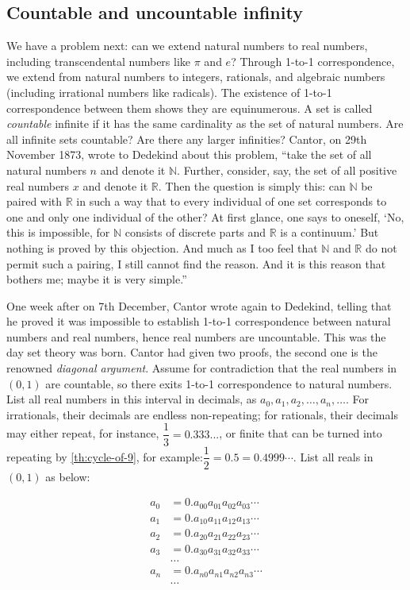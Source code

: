 \documentclass[b5paper]{article}
\begin{document}
\subsection{Countable and uncountable infinity}
We have a problem next: can we extend natural numbers to real numbers, including transcendental numbers like $\pi$ and $e$? Through 1-to-1 correspondence, we extend from natural numbers to integers, rationals, and algebraic numbers (including irrational numbers like radicals). The existence of 1-to-1 correspondence between them shows they are equinumerous. A set is called \emph{countable} infinite if it has the same cardinality as the set of natural numbers. Are all infinite sets countable? Are there any larger infinities? Cantor, on 29th November 1873, wrote to Dedekind about this problem, \enquote{take the set of all natural numbers $n$ and denote it $\mathbb{N}$. Further, consider, say, the set of all positive real numbers $x$ and denote it $\mathbb{R}$. Then the question is simply this: can $\mathbb{N}$ be paired with $\mathbb{R}$ in such a way that to every individual of one set corresponds to one and only one individual of the other? At first glance, one says to oneself, \enquote{No, this is impossible, for $\mathbb{N}$ consists of discrete parts and $\mathbb{R}$ is a continuum.} But nothing is proved by this objection. And much as I too feel that $\mathbb{N}$ and $\mathbb{R}$ do not permit such a pairing, I still cannot find the reason. And it is this reason that bothers me; maybe it is very simple.}

One week after on 7th December, Cantor wrote again to Dedekind, telling that he proved it was impossible to establish 1-to-1 correspondence between natural numbers and real numbers, hence real numbers are uncountable. This was the day set theory was born. Cantor had given two proofs, the second one is the renowned {\em diagonal argument}. Assume for contradiction that the real numbers in $(0, 1)$ are countable, so there exits 1-to-1 correspondence to natural numbers. List all real numbers in this interval in decimals, as $a_0, a_1, a_2, \dotsc, a_n, \dotsc$. For irrationals, their decimals are endless non-repeating; for rationals, their decimals may either repeat, for instance, $\dfrac{1}{3} = 0.333...$, or finite that can be turned into repeating by \cref{th:cycle-of-9}, for example:$\dfrac{1}{2} = 0.5 = 0.4999\dotsm$. List all reals in $(0, 1)$ as below:

\begin{align*}
a_0 &= 0.a_{00}a_{01}a_{02}a_{03}\dotsm\\
a_1 &= 0.a_{10}a_{11}a_{12}a_{13}\dotsm\\
a_2 &= 0.a_{20}a_{21}a_{22}a_{23}\dotsm\\
a_3 &= 0.a_{30}a_{31}a_{32}a_{33}\dotsm\\
    &\dotso \\
a_n &= 0.a_{n0}a_{n1}a_{n2}a_{n3}\dotsm\\
    &\dotso
\end{align*}
\end{document}
